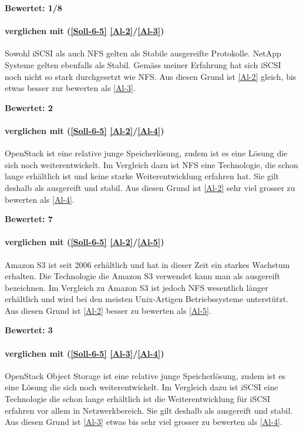 \textbf{Bewertet: 1/8}


\paragraph*{  verglichen mit  (\ref{Soll-6-5} \ref{Al-2}/\ref{Al-3})}
Sowohl iSCSI als auch NFS gelten als Stabile ausgereifte Protokolle. NetApp Systeme gelten ebenfalls als Stabil. Gemäss meiner Erfahrung hat sich iSCSI noch nicht so stark durchgesetzt wie NFS. Aus diesen Grund ist  \ref{Al-2} gleich, bis etwas besser zur bewerten als  \ref{Al-3}.

\textbf{Bewertet: 2}

\paragraph*{  verglichen mit  (\ref{Soll-6-5} \ref{Al-2}/\ref{Al-4})}
OpenStack ist eine relative junge Speicherlösung, zudem ist es eine Lösung die sich noch weiterentwickelt. Im Vergleich dazu ist NFS eine Technologie, die schon lange erhältlich ist und keine starke Weiterentwicklung erfahren hat. Sie gilt deshalb als ausgereift und stabil.
Aus diesen Grund ist  \ref{Al-2} sehr viel grosser zu bewerten als  \ref{Al-4}.

 \textbf{Bewertet: 7}

\paragraph*{  verglichen mit  (\ref{Soll-6-5} \ref{Al-2}/\ref{Al-5})}
Amazon S3 ist seit 2006 erhältlich und hat in dieser Zeit ein starkes Wachstum erhalten. Die Technologie die Amazon S3 verwendet kann man als ausgereift bezeichnen. Im Vergleich zu Amazon S3 ist jedoch NFS wesentlich länger erhältlich und wird bei den meisten Unix-Artigen Betriebssysteme unterstützt.
Aus diesen Grund ist  \ref{Al-2} besser zu bewerten als  \ref{Al-5}.

 \textbf{Bewertet: 3}

\paragraph*{  verglichen mit  (\ref{Soll-6-5} \ref{Al-3}/\ref{Al-4})}
OpenStack  Object Storage ist eine relative junge Speicherlösung, zudem ist es eine Lösung die sich noch weiterentwickelt. Im Vergleich dazu ist iSCSI eine Technologie die schon lange erhältlich ist die Weiterentwicklung für iSCSI erfahren vor allem in Netzwerkbereich. Sie gilt deshalb als ausgereift und stabil.
Aus diesen Grund ist  \ref{Al-3} etwas bis sehr viel grosser zu bewerten als  \ref{Al-4}.

